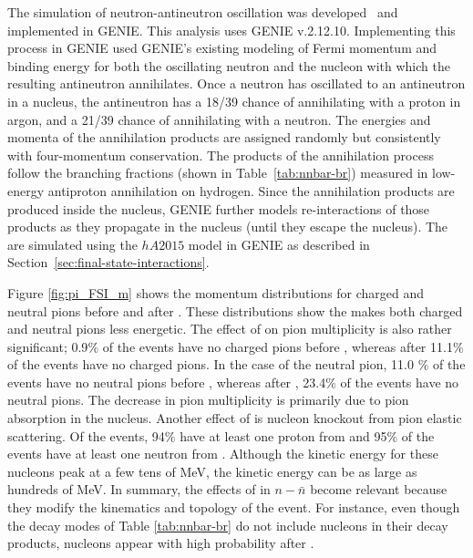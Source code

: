 The simulation of neutron-antineutron oscillation was developed~\cite{Hewes:2017xtr} and implemented in GENIE. This analysis uses GENIE v.2.12.10.
Implementing this process in GENIE used GENIE's existing modeling of Fermi momentum and binding energy for both the oscillating neutron and the nucleon with which the resulting antineutron annihilates.   Once a neutron has oscillated to an antineutron in a nucleus, the antineutron has a 18/39 chance of annihilating with a proton in argon, and a 21/39 chance of annihilating with a neutron. The energies and momenta of the annihilation products are assigned randomly but consistently with four-momentum conservation. The products of the annihilation process follow the branching fractions (shown in Table~\ref{tab:nnbar-br}) measured in low-energy antiproton annihilation on hydrogen.
Since the annihilation products are produced inside the nucleus, GENIE further models re-interactions of those products as they propagate in the nucleus (until they escape the nucleus).  The  are simulated using the $hA2015$ model in GENIE as described in Section~\ref{sec:final-state-interactions}.

Figure \ref{fig:pi_FSI_m} shows the momentum distributions for charged and neutral pions before  and after . These distributions show the  makes both charged and neutral pions less energetic.  The effect of  on pion multiplicity is also rather significant; 0.9$\%$ of the events have no charged pions before , whereas after  11.1$\%$ of the events have no charged pions. In the case of the neutral pion, 11.0 $\%$ of the events have no neutral pions before , whereas after , 23.4$\%$ of the events have no neutral pions. The decrease in pion multiplicity is primarily due to pion absorption in the nucleus. Another effect of  is nucleon knockout from pion elastic scattering. Of the events, 94$\%$ have at least one proton from  and 95$\%$ of the events have at least one neutron from . Although the kinetic energy for these nucleons peak at a few tens of MeV, the kinetic energy can be as large as hundreds of MeV.  In summary, the effects of  in $n-\bar{n}$ become relevant because they modify the kinematics and topology of the event. For instance, even though the decay modes of Table \ref{tab:nnbar-br} do not include nucleons in their decay products, nucleons appear with high probability after .

